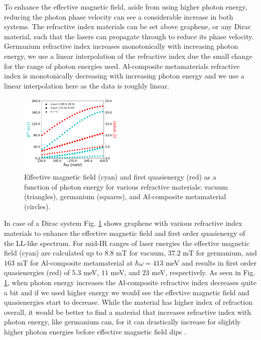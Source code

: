 \documentclass[aps,prb,twocolumn,showpacs,superscriptaddress]{revtex4-2}
\begin{document}
To enhance the effective magnetic field, aside from using higher photon energy, reducing the photon phase velocity can see a considerable increase in both systems.
The refractive index materials can be set above graphene, or any Dirac material, such that the lasers can propagate through to reduce its phase velocity.
Germanium refractive index increases monotonically with increasing photon energy, we use a linear interpolation of the refractive index due the small change for the range of photon energies used.
Al-composite metamaterials refractive index is monotonically decreasing with increasing photon energy and we use a linear interpolation here as the data is roughly linear.

\begin{figure}[h]
  \includegraphics[width=0.45\textwidth]{./figures/dirac-eff-bfield-energy.pdf}
  \caption{Effective magnetic field (cyan) and first quasienergy (red) as a function of photon energy for various refractive materials: vacuum (triangles), germanium (squares), and  Al-composite metamaterial (circles).}
  \label{fig:dirac-bfield-energy}
\end{figure}

In case of a Dirac system Fig. \ref{fig:dirac-bfield-energy} shows graphene with various refractive index materials to enhance the effective magnetic field and first order quasienergy of the LL-like spectrum.
For mid-IR ranges of laser energies the effective magnetic field (cyan) are calculated up to $8.8$ mT for vacuum, $37.2$ mT for germanium, and $163$ mT for Al-composite metamaterial at $\hbar\omega=413$ meV and results in first order quasienergies (red) of $5.3$ meV, $11$ meV, and $23$ meV, respectively.
As seen in Fig. \ref{fig:dirac-bfield-energy}, when photon energy increases the Al-composite refractive index decreases quite a bit and if we used higher energy we would see the effective magnetic field and quasienergies start to decrease.
While the material has higher index of refraction overall, it would be better to find a material that increases refractive index with photon energy, like germanium can, for it can drastically increase for slightly higher photon energies before effective magnetic field dips \cite{amotchkinaCharacterizationEbeamEvaporated2020}.
\end{document}
